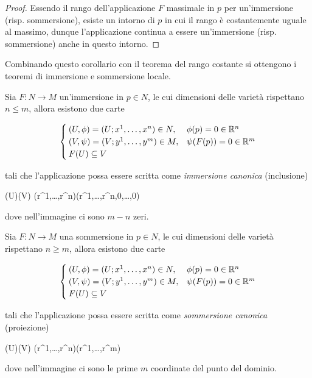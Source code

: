 \begin{proof}
	Essendo il rango dell'applicazione $ F $ massimale in $ p $ per un'immersione (risp. sommersione), esiste un intorno di $ p $ in cui il rango è costantemente uguale al massimo, dunque l'applicazione continua a essere un'immersione (risp. sommersione) anche in questo intorno.
\end{proof}

Combinando questo corollario con il teorema del rango costante si ottengono i teoremi di immersione e sommersione locale.

\begin{theorem}\label{thm:loc-imm}
	Sia $ F : N \to M $ un'immersione in $ p \in N $, le cui dimensioni delle varietà rispettano $ n \leqslant m $, allora esistono due carte
	
	\begin{equation}
		\begin{cases}
			(U,\phi) = (U; x^{1},\dots,x^{n}) \in N, & \phi(p) = 0 \in \mathbb{R}^{n} \\
			(V,\psi) = (V; y^{1},\dots,y^{m}) \in M, & \psi(F(p)) = 0  \in \mathbb{R}^{m} \\
			F(U) \subseteq V
		\end{cases}
	\end{equation}
	
	tali che l'applicazione possa essere scritta come \textit{immersione canonica} (inclusione)
	
		{\phi(U)}{\psi(V)}
		{(r^{1},\dots,r^{n})}{(r^{1},\dots,r^{n},0,\dots,0)}

	dove nell'immagine ci sono $ m-n $ zeri.
\end{theorem}

\begin{theorem}\label{thm:loc-sub}
	Sia $ F : N \to M $ una sommersione in $ p \in N $, le cui dimensioni delle varietà rispettano $ n \geqslant m $, allora esistono due carte
	
	\begin{equation}
		\begin{cases}
			(U,\phi) = (U; x^{1},\dots,x^{n}) \in N, & \phi(p) = 0 \in \mathbb{R}^{n} \\
			(V,\psi) = (V; y^{1},\dots,y^{m}) \in M, & \psi(F(p)) = 0 \in \mathbb{R}^{m} \\
			F(U) \subseteq V
		\end{cases}
	\end{equation}
	
	tali che l'applicazione possa essere scritta come \textit{sommersione canonica} (proiezione)
	
		{\phi(U)}{\psi(V)}
		{(r^{1},\dots,r^{n})}{(r^{1},\dots,r^{m})}
	
	dove nell'immagine ci sono le prime $ m $ coordinate del punto del dominio.
\end{theorem}

